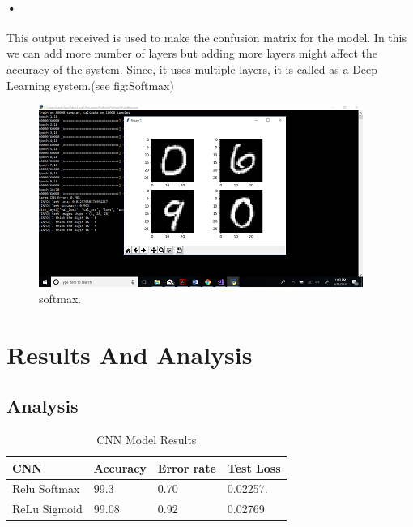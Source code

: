 \documentclass{article}
\begin{document}
\paragraph{•}
This output received is used to make the confusion matrix for the model. In this we can add more number of layers but adding more layers might affect the accuracy of the system. Since, it uses multiple layers,  it is called as a Deep Learning system.(see fig:Softmax)
\begin{figure}
  \includegraphics[width=\linewidth]{softmax.png}
  \caption{softmax.}
  \label{fig:softmax}
\end{figure}


\section{Results And Analysis }
\label{gen_inst}

\subsection{Analysis}

\begin{table}[ht]
\begin{center}
\caption{CNN Model Results} %
\centering 
 	 \label{CNN-table}
 	 \centering
    \begin{tabular}{ | l | l | l | p{5cm} |}
    \hline
    CNN & Accuracy & Error rate & Test Loss \\ \hline
    Relu Softmax & 99.3 & 0.70 & 0.02257. \\ \hline
    ReLu Sigmoid & 99.08 & 0.92 & 0.02769 \\ \hline    
    \end{tabular}
\end{center}

\end{table}
\end{document}
